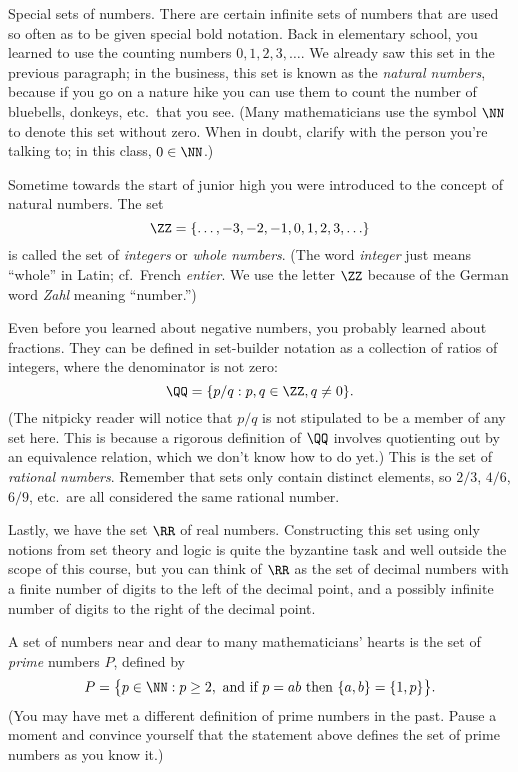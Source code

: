\medskip\boldlabel Special sets of numbers.
There are certain infinite sets of numbers that are used so often as to be given special bold notation.
Back in elementary school, you learned to use the counting numbers $0, 1, 2, 3, \ldots$. We already saw this
set in the previous paragraph; in the business,
this set is known as the {\it natural numbers}, because if you go on a nature hike you
can use them to count the number of bluebells, donkeys, etc.~that you see.
(Many mathematicians use the symbol $\NN$ to denote this set without zero. When in doubt,
clarify with the person you're talking to; in this class, $0\in \NN$.)

Sometime towards the start of junior high you were introduced to the concept of natural numbers. The set
$$\ZZ=\{ \ldots, -3, -2, -1, 0, 1, 2, 3, \ldots\}$$
is called the set of {\it integers} or {\it whole numbers}.
(The word {\it integer} just means ``whole'' in Latin; cf.~French {\it entier}. We use the letter $\ZZ$
because of the German word {\it Zahl} meaning ``number.'')

Even before you learned about negative numbers, you probably learned about fractions. They can be defined
in set-builder notation as a collection of ratios of integers, where the denominator is not zero:
$$\QQ = \{ p/q : p, q\in \ZZ, q\ne 0\}.$$
(The nitpicky reader will notice that $p/q$ is not stipulated to be a member of any set here. This is because
a rigorous definition of $\QQ$ involves quotienting out by an equivalence relation, which we don't know how to
do yet.)
This is the set of {\it rational numbers}.
Remember that sets only contain distinct elements, so $2/3$, $4/6$, $6/9$, etc.~are all considered the
same rational number.

Lastly, we have the set $\RR$ of real numbers. Constructing this set using only notions from set theory
and logic is quite the byzantine task and well outside the scope of this course, but you can think of
$\RR$ as the set of decimal numbers with a finite number of digits to the left of the decimal point, and
a possibly infinite number of digits to the right of the decimal point.

A set of numbers near and dear to many mathematicians' hearts is the set of {\it prime} numbers $P$,
defined by
$$P = \bigl\{ p\in \NN : p\ge 2,\ \hbox{and if $p = ab$ then $\{a,b\} = \{1,p\}$}\bigr\}.$$
(You may have met a different definition of prime numbers in the past. Pause a moment and convince
yourself that the statement above defines the set of prime numbers as you know it.)
\endgroup%

